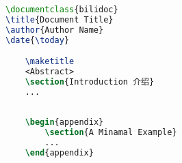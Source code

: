 \begin{lstlisting}[language=LaTeX, label=listing:a-minimal-example]
\documentclass{bilidoc}
\title{Document Title}
\author{Author Name}
\date{\today}

    \maketitle
    <Abstract>
    \section{Introduction 介绍}
    ...
    
    
    \begin{appendix}
        \section{A Minamal Example}
        ...
    \end{appendix}

\end{lstlisting}